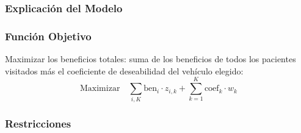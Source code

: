 \documentclass[12pt]{article}
\begin{document}
\subsubsection{Explicación del Modelo}

\subsubsection*{Función Objetivo}

Maximizar los beneficios totales: suma de los beneficios de todos los pacientes visitados más el coeficiente de deseabilidad del vehículo elegido:
\[
\text{Maximizar} \quad \sum_{i,K} \text{ben}_i \cdot z_{i,k} + \sum_{k=1}^{K} \text{coef}_k \cdot w_k
\]

\subsubsection*{Restricciones}
\end{document}
